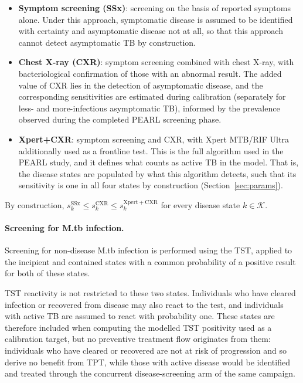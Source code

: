 \documentclass[11pt]{article}
\begin{document}
\begin{itemize}
    \item \textbf{Symptom screening (SSx)}: screening on the basis of reported symptoms alone. Under this approach, symptomatic disease is assumed to be identified with certainty and asymptomatic disease not at all, so that this approach cannot detect asymptomatic TB by construction.
    \item \textbf{Chest X-ray (CXR)}: symptom screening combined with chest X-ray, with bacteriological confirmation of those with an abnormal result. The added value of CXR lies in the detection of asymptomatic disease, and the corresponding sensitivities are estimated during calibration (separately for less- and more-infectious asymptomatic TB), informed by the prevalence observed during the completed PEARL screening phase.    
    \item \textbf{Xpert+CXR}: symptom screening and CXR, with Xpert MTB/RIF Ultra additionally used as a frontline test. This is the full algorithm used in the PEARL study, and it defines what counts as active TB in the model. That is, the disease states are populated by what this algorithm detects, such that its sensitivity is one in all four states by construction (Section~\ref{sec:params}).
\end{itemize}

\noindent By construction, \(s^{\mathrm{SSx}}_k \le s^{\mathrm{CXR}}_k \le s^{\mathrm{Xpert+CXR}}_k\) for every disease state \(k \in \mathcal{K}\).

\paragraph{Screening for M.tb infection.}
Screening for non-disease M.tb infection is performed using the TST, applied to the incipient and contained states with a common probability of a positive result for both of these states.

TST reactivity is not restricted to these two states. Individuals who have cleared infection or recovered from disease may also react to the test, and individuals with active TB are assumed to react with probability one. These states are therefore included when computing the modelled TST positivity used as a calibration target, but no preventive treatment flow originates from them: individuals who have cleared or recovered are not at risk of progression and so derive no benefit from TPT, while those with active disease would be identified and treated through the concurrent disease-screening arm of the same campaign.
\end{document}
